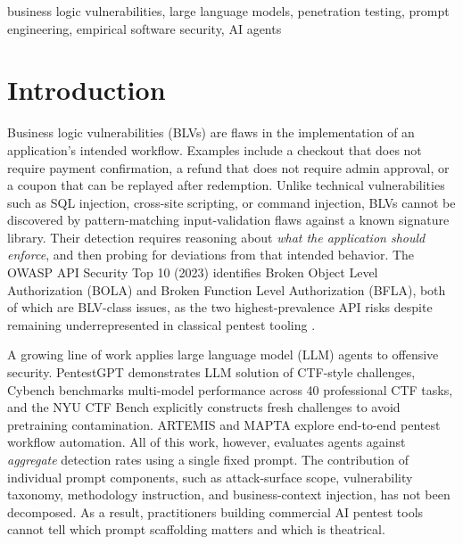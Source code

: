 \documentclass[conference]{IEEEtran}
\begin{document}
\begin{IEEEkeywords}
business logic vulnerabilities, large language models, penetration testing, prompt engineering, empirical software security, AI agents
\end{IEEEkeywords}

\section{Introduction}
\label{sec:introduction}

Business logic vulnerabilities (BLVs) are flaws in the implementation of an application's intended workflow. Examples include a checkout that does not require payment confirmation, a refund that does not require admin approval, or a coupon that can be replayed after redemption. Unlike technical vulnerabilities such as SQL injection, cross-site scripting, or command injection, BLVs cannot be discovered by pattern-matching input-validation flaws against a known signature library. Their detection requires reasoning about \emph{what the application should enforce}, and then probing for deviations from that intended behavior. The OWASP API Security Top 10 (2023) identifies Broken Object Level Authorization (BOLA) and Broken Function Level Authorization (BFLA), both of which are BLV-class issues, as the two highest-prevalence API risks despite remaining underrepresented in classical pentest tooling \cite{owasp_api2023, felmetsger2010}.

A growing line of work applies large language model (LLM) agents to offensive security. PentestGPT \cite{deng2024pentestgpt} demonstrates LLM solution of CTF-style challenges, Cybench \cite{zhang2024cybench} benchmarks multi-model performance across 40 professional CTF tasks, and the NYU CTF Bench \cite{shao2024nyuctf} explicitly constructs fresh challenges to avoid pretraining contamination. ARTEMIS \cite{tan2024artemis} and MAPTA \cite{mayoral2024mapta} explore end-to-end pentest workflow automation. All of this work, however, evaluates agents against \emph{aggregate} detection rates using a single fixed prompt. The contribution of individual prompt components, such as attack-surface scope, vulnerability taxonomy, methodology instruction, and business-context injection, has not been decomposed. As a result, practitioners building commercial AI pentest tools cannot tell which prompt scaffolding matters and which is theatrical.
\end{document}
